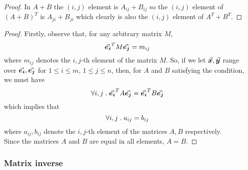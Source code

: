 \documentclass[../MathsNotesBase.tex]{subfiles}
\begin{document}
{		\medskip
		\begin{proof}
			In ${ A + B }$ the ${ (i,j) }$ element is ${ A_{ij} + B_{ij} }$ so the ${ (i,j) }$ element of ${ (A + B)^T }$ is ${ A_{ji} + B_{ji} }$ which clearly is also the ${ (i,j) }$ element of ${  A^T + B^T }$. \qedhere
		\end{proof}
	
		\bigskip
		\begin{proof}
			Firstly, observe that, for any arbitrary matrix $M$,
			\[ \vec{\bm{e_i}}^T M \vec{\bm{e_j}} = m_{ij} \]
			where $m_{ij}$ denotes the $i,j$-th element of the matrix $M$. So, if we let ${ \vec{\bm{x}},\vec{\bm{y}} }$ range over ${ \vec{\bm{e_i}},\vec{\bm{e_j}} }$ for ${ 1 \leq i \leq m, \, 1 \leq j \leq n }$, then, for $A$ and $B$ satisfying the condition, we must have
			\[ \forall i,j \;.\; \vec{\bm{e_i}}^T A \vec{\bm{e_j}} = \vec{\bm{e_i}}^T B \vec{\bm{e_j}} \]
			which implies that
			\[ \forall i,j \;.\; a_{ij} = b_{ij} \]
			where $a_{ij}, b_{ij}$ denote the $i,j$-th element of the matrices $A,B$ respectively.\\
			
			Since the matrices $A$ and $B$ are equal in all elements, ${ A = B }$.
		\end{proof}
	
	
		
		\biggerskip
		\subsubsection{Matrix inverse}
		
}
\end{document}
